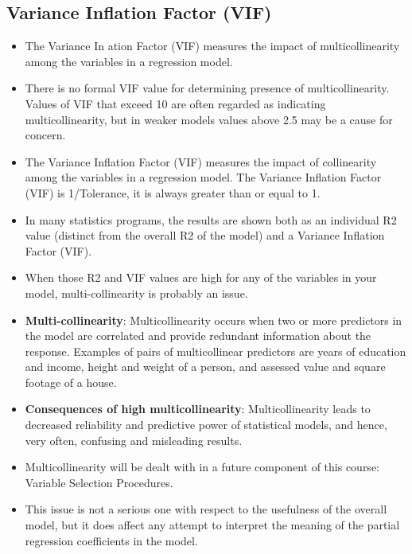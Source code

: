 \documentclass[]{report}
\begin{document}
\subsection{Variance Inflation Factor (VIF)}
\begin{itemize}
\item  The Variance In
ation Factor (VIF) measures the impact of multicollinearity among the variables in a
regression model.
\item  There is no formal VIF value for determining presence of multicollinearity. Values of VIF that exceed 10
are often regarded as indicating multicollinearity, but in weaker models values above 2.5 may be a cause
for concern.

\item The Variance Inflation Factor (VIF) measures the impact of collinearity among the variables in a regression model. The Variance Inflation Factor (VIF) is 1/Tolerance, it is always greater than or equal to 1. 


\item  In many statistics programs, the results are shown both as an individual R2 value (distinct from the
overall R2 of the model) and a Variance Inflation Factor (VIF).
\item  When those R2 and VIF values are high for any of the variables in your model, multi-collinearity is
probably an issue.

\item \textbf{Multi-collinearity}: Multicollinearity occurs when two or more predictors in the model are
correlated and provide redundant information about the response. Examples of pairs of multicollinear predictors are years of education and income, height and weight of a person, and assessed value and square footage
of a house.

\item \textbf{Consequences of high multicollinearity}:
Multicollinearity leads to decreased reliability and predictive power of statistical models, and hence, very often, confusing and misleading results.
\item Multicollinearity will be dealt with in a future component of this course: Variable Selection Procedures.
\item This issue is not a serious one with respect to the
usefulness of the overall model, but it does affect any attempt to interpret the meaning of the partial regression
coefficients in the model.


\end{itemize}
\end{document}
